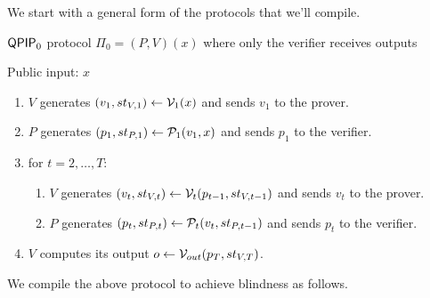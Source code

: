 We start with a general form of the protocols that we'll compile.

\begin{protocol}{$\operatorname{\mathsf{QPIP}}_0$ protocol $\Pi_0=(P, V)(x)$ where only the verifier receives outputs}
	
	Public input: $x$
	\begin{enumerate}
		\item $V$ generates $(v_1, st_{V, 1})\leftarrow\mathcal{V}_1(x)$ and sends $v_1$ to the prover.
		\item $P$ generates $(p_1, st_{P, 1})\leftarrow\mathcal{P}_1(v_1, x)$ and sends $p_1$ to the verifier.
		\item for $t=2,\ldots,T$:
		\begin{enumerate}
			\item $V$ generates $(v_t, st_{V, t})\leftarrow\mathcal{V}_t(p_{t-1}, st_{V, t-1})$ and sends $v_t$ to the prover.
			\item $P$ generates $(p_t, st_{P, t})\leftarrow\mathcal{P}_t(v_t, st_{P, t-1})$ and sends $p_t$ to the verifier.
		\end{enumerate}
		\item $V$ computes its output $o\leftarrow\mathcal{V}_{out}(p_T, st_{V, T})$.
	\end{enumerate}

\end{protocol}

We compile the above protocol to achieve blindness as follows.

